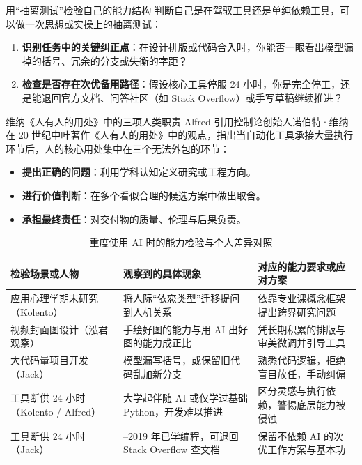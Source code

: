 \documentclass[UTF8,a4paper,11pt,fontset=fandol]{ctexart}
\begin{document}
\begin{importantbox}{用“抽离测试”检验自己的能力结构}
判断自己是在驾驭工具还是单纯依赖工具，可以做一次思想或实操上的抽离测试：
\begin{enumerate}
\item \textbf{识别任务中的关键纠正点}：在设计排版或代码合入时，你能否一眼看出模型漏掉的括号、冗余的分支或失衡的字距？
\item \textbf{检查是否存在次优备用路径}：假设核心工具停服 24 小时，你是完全停工，还是能退回官方文档、问答社区（如 Stack Overflow）或手写草稿继续推进？
\end{enumerate}
\end{importantbox}
\begin{knowledgebox}{维纳《人有人的用处》中的三项人类职责}
Alfred 引用控制论创始人诺伯特·维纳在 20 世纪中叶著作《人有人的用处》中的观点，指出当自动化工具承接大量执行环节后，人的核心用处集中在三个无法外包的环节：
\begin{itemize}
\item \textbf{提出正确的问题}：利用学科认知定义研究或工程方向。
\item \textbf{进行价值判断}：在多个看似合理的候选方案中做出取舍。
\item \textbf{承担最终责任}：对交付物的质量、伦理与后果负责。
\end{itemize}
\end{knowledgebox}
\begin{table}[H]\centering\small
\caption{重度使用 AI 时的能力检验与个人差异对照}
\begin{tabular}{>{\raggedright\arraybackslash}p{\dimexpr(\linewidth-6\tabcolsep)/3\relax}>{\raggedright\arraybackslash}p{\dimexpr(\linewidth-6\tabcolsep)/3\relax}>{\raggedright\arraybackslash}p{\dimexpr(\linewidth-6\tabcolsep)/3\relax}}
\toprule
检验场景或人物 & 观察到的具体现象 & 对应的能力要求或应对方案\\\midrule
应用心理学期末研究（Kolento） & 将人际“依恋类型”迁移提问到人机关系 & 依靠专业课概念框架提出跨界研究问题\\[4pt]
视频封面图设计（泓君观察） & 手绘好图的能力与用 AI 出好图的能力成正比 & 凭长期积累的排版与审美微调并引导工具\\[4pt]
大代码量项目开发（Jack） & 模型漏写括号，或保留旧代码乱加新分支 & 熟悉代码逻辑，拒绝盲目放任，手动纠偏\\[4pt]
工具断供 24 小时（Kolento / Alfred） & 大学起伴随 AI 或仅学过基础 Python，开发难以推进 & 区分灵感与执行依赖，警惕底层能力被侵蚀\\[4pt]
工具断供 24 小时（Jack） & 2018–2019 年已学编程，可退回 Stack Overflow 查文档 & 保留不依赖 AI 的次优工作方案与基本功\\[4pt]
\bottomrule\end{tabular}\end{table}
\end{document}
